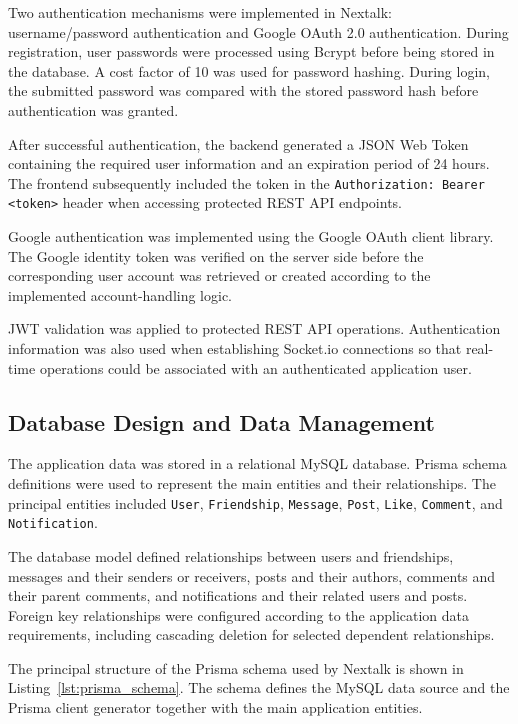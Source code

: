 \documentclass[12pt, a4paper]{article}
\begin{document}
Two authentication mechanisms were implemented in Nextalk: username/password authentication and Google OAuth 2.0 authentication. During registration, user passwords were processed using Bcrypt before being stored in the database. A cost factor of 10 was used for password hashing. During login, the submitted password was compared with the stored password hash before authentication was granted.

After successful authentication, the backend generated a JSON Web Token containing the required user information and an expiration period of 24 hours. The frontend subsequently included the token in the \texttt{Authorization: Bearer <token>} header when accessing protected REST API endpoints.

Google authentication was implemented using the Google OAuth client library. The Google identity token was verified on the server side before the corresponding user account was retrieved or created according to the implemented account-handling logic.

JWT validation was applied to protected REST API operations. Authentication information was also used when establishing Socket.io connections so that real-time operations could be associated with an authenticated application user.


\subsection{Database Design and Data Management}

The application data was stored in a relational MySQL database. Prisma schema definitions were used to represent the main entities and their relationships. The principal entities included \texttt{User}, \texttt{Friendship}, \texttt{Message}, \texttt{Post}, \texttt{Like}, \texttt{Comment}, and \texttt{Notification}.

The database model defined relationships between users and friendships, messages and their senders or receivers, posts and their authors, comments and their parent comments, and notifications and their related users and posts. Foreign key relationships were configured according to the application data requirements, including cascading deletion for selected dependent relationships.

The principal structure of the Prisma schema used by Nextalk is shown in Listing~\ref{lst:prisma_schema}. The schema defines the MySQL data source and the Prisma client generator together with the main application entities.
\end{document}
